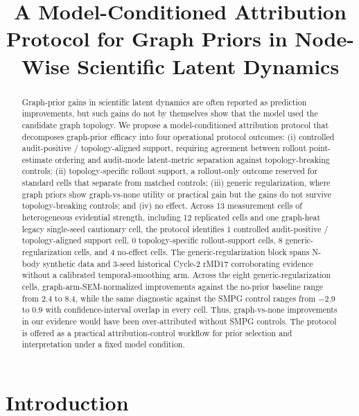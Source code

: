 \documentclass[preprint,12pt]{elsarticle}
\begin{document}
\begin{frontmatter}
\title{A Model-Conditioned Attribution Protocol for Graph Priors in Node-Wise Scientific Latent Dynamics}
\begin{abstract}

Graph-prior gains in scientific latent dynamics are often reported as
prediction improvements, but such gains do not by themselves show that
the model used the candidate graph topology. We propose a
model-conditioned attribution protocol that decomposes graph-prior
efficacy into four operational protocol outcomes: (i) controlled
audit-positive / topology-aligned support, requiring agreement between
rollout point-estimate ordering and audit-mode latent-metric
separation against topology-breaking controls; (ii) topology-specific
rollout support, a rollout-only outcome reserved for standard cells
that separate from matched controls; (iii) generic regularization,
where graph priors show graph-vs-none utility or practical gain but
the gains do not survive topology-breaking controls; and (iv) no
effect. Across
13 measurement cells of heterogeneous evidential strength, including
12 replicated cells and one graph-heat legacy single-seed cautionary
cell, the protocol identifies 1 controlled audit-positive /
topology-aligned support cell, 0 topology-specific rollout-support
cells, 8 generic-regularization cells, and 4 no-effect cells. The
generic-regularization block spans N-body synthetic data and 3-seed
historical Cycle-2 rMD17 corroborating evidence without a calibrated
temporal-smoothing arm. Across the
eight generic-regularization cells, graph-arm-SEM-normalized
improvements against the no-prior baseline range from 2.4 to 8.4,
while the same diagnostic against the SMPG control ranges from \(-2.9\)
to \(0.9\) with confidence-interval overlap in every cell. Thus,
graph-vs-none improvements in our evidence would have been
over-attributed without SMPG controls. The protocol is offered as a
practical attribution-control workflow for prior selection and
interpretation under a fixed model condition.

\end{abstract}
\end{frontmatter}

\section{Introduction}
\end{document}
